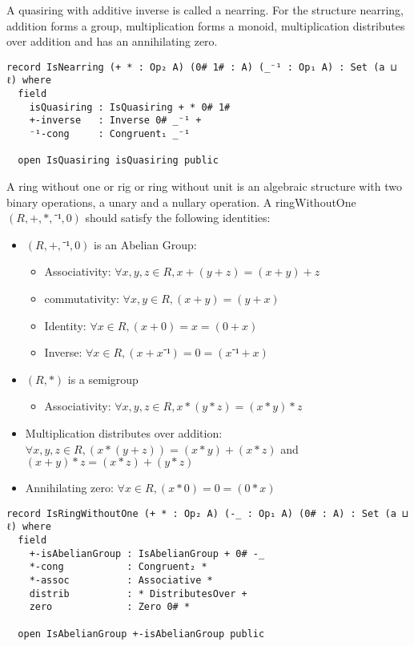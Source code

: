 A quasiring with additive inverse is called a nearring. For the structure
nearring, addition forms a group, multiplication forms a monoid, multiplication
distributes over addition and has an annihilating zero.

\begin{verbatim}
record IsNearring (+ * : Op₂ A) (0# 1# : A) (_⁻¹ : Op₁ A) : Set (a ⊔ ℓ) where
  field
    isQuasiring : IsQuasiring + * 0# 1#
    +-inverse   : Inverse 0# _⁻¹ +
    ⁻¹-cong     : Congruent₁ _⁻¹

  open IsQuasiring isQuasiring public
\end{verbatim}

A ring without one or rig or ring without unit is an algebraic structure with
two binary operations, a unary and a nullary operation. A ringWithoutOne
$(R,+,*,⁻¹,0)$ should satisfy the following identities:
\begin{itemize}
  \item $(R,+,⁻¹,0)$ is an Abelian Group:
   \begin{itemize}
    \item Associativity: $\forall x,y,z \in R, x + (y + z) = (x + y) + z$
    \item commutativity: $\forall x,y \in R, (x + y) = (y + x)$
    \item Identity: $\forall x \in R, (x + 0) = x = (0 + x)$
    \item Inverse: $\forall x \in R, (x + x⁻¹) = 0 = (x⁻¹ + x)$
  \end{itemize}
  \item $(R,*)$ is a semigroup
  \begin{itemize}
    \item Associativity: $ \forall x,y,z \in R, x * (y*z)  = (x*y)*z$
  \end{itemize}
  \item Multiplication distributes over addition: \(\forall x , y , z \in R, (x * (y + z)) = (x * y) + (x
  * z)\) and \( (x + y) * z = (x * z) + (y * z) \)
  \item Annihilating zero: \(\forall x \in R, (x * 0) = 0 = (0 * x)\)
\end{itemize}

\begin{verbatim}
record IsRingWithoutOne (+ * : Op₂ A) (-_ : Op₁ A) (0# : A) : Set (a ⊔ ℓ) where
  field
    +-isAbelianGroup : IsAbelianGroup + 0# -_
    *-cong           : Congruent₂ *
    *-assoc          : Associative *
    distrib          : * DistributesOver +
    zero             : Zero 0# *

  open IsAbelianGroup +-isAbelianGroup public
\end{verbatim}

